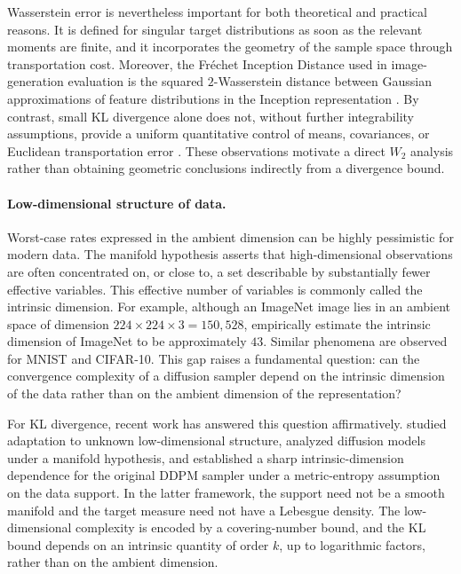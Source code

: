 \documentclass[11pt]{article}
\theoremstyle{definition}
\begin{document}
Wasserstein error is nevertheless important for both theoretical and practical reasons. It is defined for singular target distributions as soon as the relevant moments are finite, and it incorporates the geometry of the sample space through transportation cost. Moreover, the Fr\'echet Inception Distance used in image-generation evaluation is the squared $2$-Wasserstein distance between Gaussian approximations of feature distributions in the Inception representation \citep{heusel2017gans}. By contrast, small KL divergence alone does not, without further integrability assumptions, provide a uniform quantitative control of means, covariances, or Euclidean transportation error \citep{beyler2025convergence}. These observations motivate a direct $W_2$ analysis rather than obtaining geometric conclusions indirectly from a divergence bound.

\paragraph{Low-dimensional structure of data.}
Worst-case rates expressed in the ambient dimension can be highly pessimistic for modern data. 
The manifold hypothesis asserts that high-dimensional observations are often concentrated on, 
or close to, a set describable by substantially fewer effective variables. 
This effective number of variables is commonly called the intrinsic dimension. 
For example, although an ImageNet image 
 lies in an ambient space of dimension $224\times224\times3 = 150{,}528$, 
\citet{pope2021intrinsic} empirically estimate the intrinsic dimension of ImageNet to be approximately $43$.
Similar phenomena are observed for MNIST and CIFAR-10. This gap raises a fundamental question: can the convergence complexity of a diffusion sampler depend on the intrinsic dimension of the data rather than on the ambient dimension of the representation?

For KL divergence, recent work has answered this question
affirmatively. \citet{li2024adapting} studied adaptation to unknown
low-dimensional structure, \citet{azangulov2024manifold} analyzed
diffusion models under a manifold hypothesis, and
\citet{huang2026optimal} established a sharp intrinsic-dimension
dependence for the original DDPM sampler under a metric-entropy
assumption on the data support. In the latter framework, the support
need not be a smooth manifold and the target measure need not have a
Lebesgue density. The low-dimensional complexity is encoded by a
covering-number bound, and the KL bound depends on an intrinsic
quantity of order $k$, up to logarithmic factors, rather than on the
ambient dimension.
\end{document}
